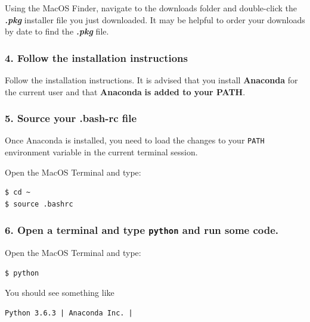\documentclass{book}
\begin{document}
Using the MacOS Finder, navigate to the downloads folder and
double-click the \textbf{\emph{.pkg}} installer file you just
downloaded. It may be helpful to order your downloads by date to find
the \textbf{\emph{.pkg}} file.
    




    
        \subsubsection{4. Follow the installation
instructions}\label{follow-the-installation-instructions}

Follow the installation instructions. It is advised that you install
\textbf{Anaconda} for the current user and that \textbf{Anaconda}
\textbf{is added to your PATH}.
    




    
        \subsubsection{5. Source your .bash-rc
file}\label{source-your-.bash-rc-file}

Once Anaconda is installed, you need to load the changes to your
\lstinline!PATH! environment variable in the current terminal session.

Open the MacOS Terminal and type:

\begin{lstlisting}
$ cd ~
$ source .bashrc
\end{lstlisting}
    




    
        \subsubsection{\texorpdfstring{6. Open a terminal and type
\texttt{python} and run some
code.}{6. Open a terminal and type python and run some code.}}\label{open-a-terminal-and-type-python-and-run-some-code.}

Open the MacOS Terminal and type:

\begin{lstlisting}
$ python
\end{lstlisting}

You should see something like

\begin{lstlisting}
Python 3.6.3 | Anaconda Inc. |
\end{lstlisting}
\end{document}
